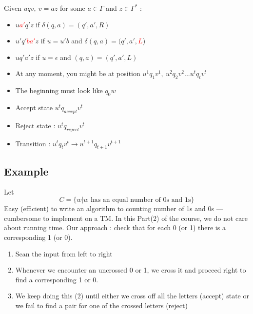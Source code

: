 \documentclass[12pt,a4paper]{article}
\newcommand{\<}{\langle}
\renewcommand{\>}{\rangle}
\begin{document}
 Given $uqv,\ v = az$ for some $a \in \Gamma$ and $z \in \Gamma^*$ :
\begin{itemize}
    \item $u$\textcolor{red}{$a'$}$q'z$ if $\delta(q,a) = (q',a',R)$
    \item $u'q'$\textcolor{red}{$ba'$}$z$ if $u = u'b$ and $\delta(q,a) = (q',a',$\textcolor{red}{$L$})
    \item $uq'a'z$ if $u = \epsilon$ and $(q,a) = (q',a',L)$
    \item At any moment, you might be at position $u^1q_1v^1,\ u^2q_2v^2...u^tq_tv^t$
    \item The beginning must look like $q_0w$
    \item Accept state $u^t q_{accept} v^t$
    \item Reject state : $u^t q_{reject} v^t$
    \item Transition : $u^t q_t v^t \to u^{t+1} q_{t+1} v^{t+1}$
\end{itemize}
\subsection{Example}
Let 
\[C = \{w | w \text{ has an equal number of 0s and 1s}\}\]
Easy (efficient) to write an algorithm to counting number of 1s and 0s --- cumbersome to implement on a TM. In this Part(2) of the course, we do not care about running time. Our approach : check that for each 0 (or 1) there is a corresponding 1 (or 0).
\begin{enumerate}
    \item Scan the input from left to right
    \item Whenever we encounter an uncrossed 0 or 1, we cross it and proceed right to find a corresponding 1 or 0.
    \item We keep doing this (2) until either we cross off all the letters (accept) state or we fail to find a pair for one of the crossed letters (reject)
\end{enumerate}
\end{document}
